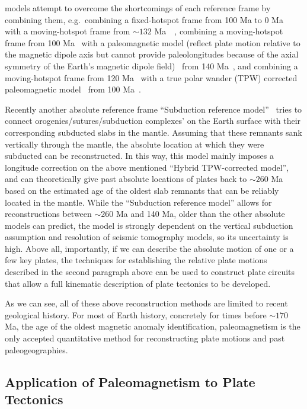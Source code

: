 models attempt to overcome the shortcomings of each reference frame by combining
them, e.g.\ combining a fixed-hotspot frame from 100 Ma to 0 Ma~\citep{M93} with
a moving-hotspot frame from ${\sim}132$
Ma~\citep{O05}~\citep[Hybrid hotspot model, see][]{Sh12}, combining a
moving-hotspot frame from 100 Ma~\citep{O05} with a paleomagnetic
model (reflect plate motion relative to the magnetic dipole axis but cannot
provide paleolongitudes because of the axial symmetry of the Earth's magnetic
dipole field)~\citep{T08} from 140 Ma~\citep[Hybrid paleomagnetic
model, see][]{Sh12}, and combining a moving-hotspot frame from 120
Ma~\citep{O05} with a true polar wander (TPW) corrected paleomagnetic
model~\citep{S08} from 100 Ma~\citep[Hybrid TPW-corrected model,
see][]{Sh12}.

Recently another absolute reference frame ``Subduction reference
model''~\citep{v10} tries to connect orogenies/sutures/subduction complexes' on
the Earth surface with their corresponding subducted slabs in the mantle.
Assuming that these remnants sank vertically through the mantle, the absolute
location at which they were subducted can be reconstructed. In this way, this
model mainly imposes a longitude correction on the above mentioned ``Hybrid
TPW-corrected model'', and can theoretically give past absolute locations of
plates back to ${\sim}260$ Ma based on the estimated age of the oldest slab
remnants that can be reliably located in the mantle. While the ``Subduction
reference model'' allows for reconstructions between ${\sim}260$ Ma and 140 Ma,
older than the other absolute models can predict, the model is strongly
dependent on the vertical subduction assumption and resolution of seismic
tomography models, so its uncertainty is high. Above all, importantly, if we can
describe the absolute motion of one or a few key plates, the techniques for
establishing the relative plate motions described in the second paragraph above
can be used to construct plate circuits that allow a full kinematic description
of plate tectonics to be developed.

As we can see, all of these above reconstruction methods are limited to recent
geological history. For most of Earth history, concretely for times before
${\sim}170$ Ma, the age of the oldest magnetic anomaly identification,
paleomagnetism is the only accepted quantitative method for reconstructing plate
motions and past paleogeographies.

\subsection{Application of Paleomagnetism to Plate
Tectonics}\label{sec:applPlateTec}

